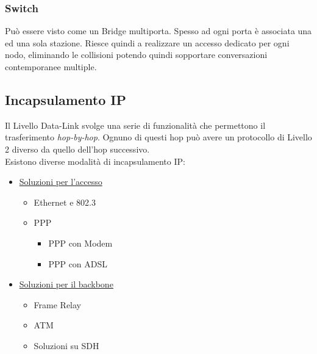 \documentclass{article}
\begin{document}
            \subsubsection{Switch}
                Può essere visto come un Bridge multiporta. Spesso ad ogni porta è associata una ed una sola stazione. Riesce quindi a realizzare un accesso dedicato per ogni nodo, eliminando le collisioni potendo quindi sopportare conversazioni contemporanee multiple.

        \subsection{Incapsulamento IP}
            Il Livello Data-Link svolge una serie di funzionalità che permettono il trasferimento \textit{hop-by-hop}. Ognuno di questi hop può avere un protocollo di Livello 2 diverso da quello dell'hop successivo.\\
            Esistono diverse modalità di incapsulamento IP:
            \begin{itemize}
                \item \underline{Soluzioni per l'accesso}
                      \begin{itemize}
                          \item Ethernet e 802.3
                          \item PPP
                                \begin{itemize}
                                    \item PPP con Modem
                                    \item PPP con ADSL
                                \end{itemize}
                      \end{itemize}
                \item \underline{Soluzioni per il backbone}
                      \begin{itemize}
                          \item Frame Relay
                          \item ATM
                          \item Soluzioni su SDH
                      \end{itemize}
            \end{itemize}
\end{document}
